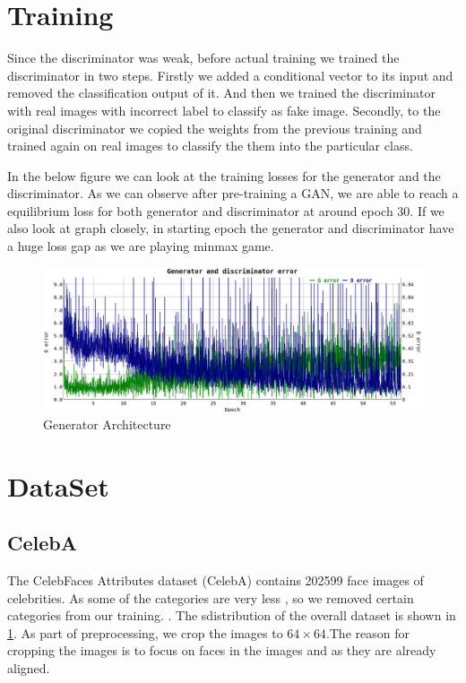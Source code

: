 \section{Training}
Since the discriminator was weak, before actual training we trained the discriminator in two steps. Firstly we added a conditional vector to its input and removed the classification output of it. And then we trained the discriminator with real images with incorrect label to classify as fake image. Secondly, to the original discriminator we copied the weights from the previous training and trained again on real images to classify the them into the particular class.  
\par

In the below figure we can look at the training losses for the generator and the discriminator. As we can observe after pre-training a GAN, we are able to reach a equilibrium loss for both generator and discriminator at around epoch 30. If we also look at graph closely, in starting epoch the generator and discriminator have a huge loss gap as we are playing minmax game. 

\begin{figure}[H]
  \centering
    \includegraphics[scale=.4, angle=0]{Files/Training-2.png}
    \caption[Generator Architecture]{Generator Architecture\cite{DCGAN}}
    \label{fig:celeba}
\end{figure}

\section{DataSet}
\subsection{CelebA}
The CelebFaces Attributes dataset (CelebA)\cite{celeba} contains 202599 face images of celebrities. As some of the categories are very less , so we removed certain categories from our training. . The sdistribution of the overall dataset is shown in \cref{fig:celeba}. As part of preprocessing, we crop the images to $64 \times 64$.The reason for cropping the images is to focus on faces in the images and as they are already aligned.


